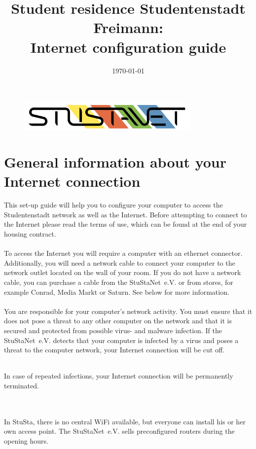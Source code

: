 \documentclass[a4paper,12pt]{scrartcl}
\title{Student residence Studentenstadt Freimann:\\
       Internet configuration guide}
\date{\today}
\begin{document}
\maketitle

\begin{figure}[t!]
   \centering
   \vspace{-20pt}
   \includegraphics[width=0.8\textwidth,keepaspectratio]{Bilder/StuStaNet_Logo}
   \vspace{-20pt}
\end{figure}

\section*{General information about your Internet connection}

This set-up guide will help you to configure your computer to access the Studentenstadt network as well as the Internet. Before attempting to connect to the Internet please read the terms of use, which can be found at the end of your housing contract.
\\
\\
To access the Internet you will require a computer with an ethernet connector. Additionally, you will need a network cable to connect your computer to the network outlet located on the wall of your room. If you do not have a network cable, you can purchase a cable from the StuStaNet~e.V. or from stores, for example Conrad, Media Markt or Saturn. See below for more information.
\\
\\
You are responsible for your computer's network activity. You must ensure that it does not pose a threat to any other computer on the network and that it is secured and protected from possible virus- and malware infection. If the StuStaNet~e.V. detects that your computer is infected by a virus and poses a threat to the computer network, your Internet connection will be cut off.
\\
\begin{bfseries}
	\\In case of repeated infections, your Internet connection will be permanently terminated.
\end{bfseries}
\\
\\
In StuSta, there is no central WiFi available, but everyone can install his or her own access point.  The StuStaNet~e.V. sells preconfigured routers during the opening hours.
\end{document}
